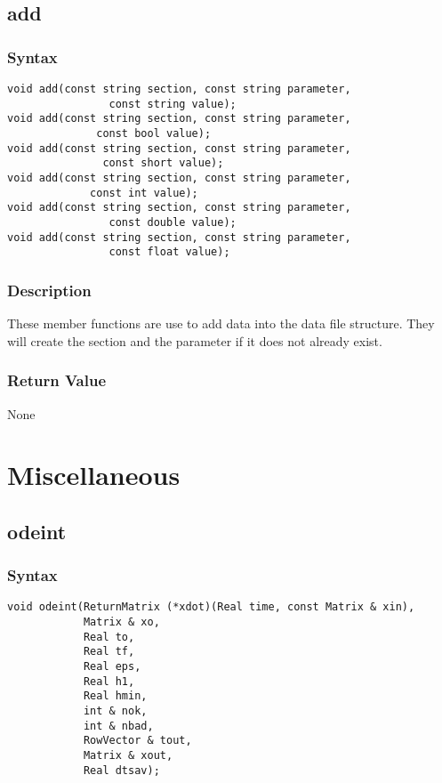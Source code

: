 \documentclass[dvips,11pt,fleqn]{report}
\begin{document}
\subsection*{add}
\subsubsection*{Syntax}
\begin{verbatim}
void add(const string section, const string parameter,
                const string value);
void add(const string section, const string parameter,
              const bool value);
void add(const string section, const string parameter,
               const short value);
void add(const string section, const string parameter,
             const int value);
void add(const string section, const string parameter,
                const double value);
void add(const string section, const string parameter,
                const float value);
\end{verbatim}

\subsubsection*{Description}   
These member functions are use to add data into the data file
structure. They will create the section and the parameter if it does
not already exist.

\subsubsection*{Return Value}
None
\newpage 

\section{Miscellaneous}

\subsection*{odeint}
\subsubsection*{Syntax}
\begin{verbatim}
void odeint(ReturnMatrix (*xdot)(Real time, const Matrix & xin),
            Matrix & xo, 
            Real to, 
            Real tf, 
            Real eps, 
            Real h1, 
            Real hmin,
            int & nok, 
            int & nbad,
            RowVector & tout, 
            Matrix & xout, 
            Real dtsav);
\end{verbatim}
\end{document}
